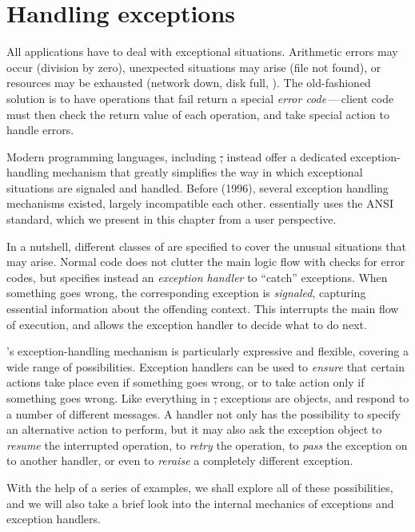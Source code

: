 \documentclass[a4paper,10pt,twoside]{book}
\begin{document}
	\sloppy
\fi

\chapter{Handling exceptions}

All applications have to deal with exceptional situations.
Arithmetic errors may occur (division by zero), unexpected situations may arise (file not found), or resources may be exhausted (network down, disk full, \etc).
The old-fashioned solution is to have operations that fail return a special \emph{error code}\,---\,client code must then check the return value of each operation, and take special action to handle errors.

Modern programming languages, including \st, instead offer a dedicated exception-handling mechanism that greatly simplifies the way in which exceptional situations are signaled and handled.
Before  (1996), several  exception handling mechanisms existed, largely incompatible each other. \pharo essentially uses the ANSI standard, which we present in this chapter from a user perspective.

In a nutshell, different classes of  are specified to cover the unusual situations that may arise.
Normal code does not clutter the main logic flow with checks for error codes, but specifies instead an \emph{exception handler} to ``catch'' exceptions.
When something goes wrong, the corresponding exception is \emph{signaled}, capturing essential information about the offending context.
This interrupts the main flow of execution, and allows the exception handler to decide what to do next.

\pharo's exception-handling mechanism is particularly expressive and flexible, covering a wide range of possibilities. Exception handlers can be used to \emph{ensure} that certain actions take place even if something goes wrong, or to take action only if something goes wrong.
Like everything in \st, exceptions are objects, and respond to a number of different messages.
A handler not only has the possibility to specify an alternative action to perform, but it may also ask the exception object to \emph{resume} the interrupted operation, to \emph{retry} the operation, to \emph{pass} the exception on to another handler, or even to \emph{reraise} a completely different exception.

With the help of a series of examples, we shall explore all of these possibilities, and we will also take a brief look into the internal mechanics of exceptions and exception handlers.
\end{document}
